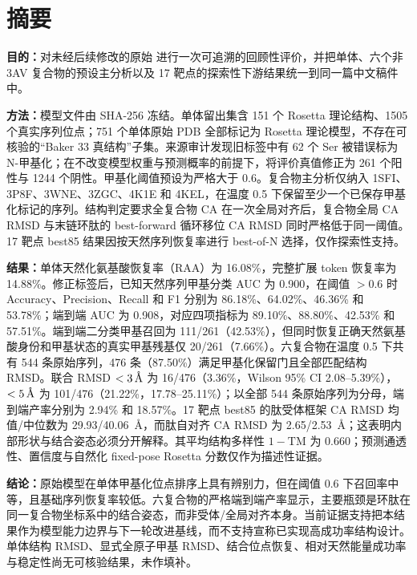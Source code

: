 \section*{摘要}

\textbf{目的：}对未经后续修改的原始  进行一次可追溯的回顾性评价，并把单体、六个非 3AV 复合物的预设主分析以及 17 靶点的探索性下游结果统一到同一篇中文稿件中。

\textbf{方法：}模型文件由 SHA-256 冻结。单体留出集含 151 个 Rosetta 理论结构、1505 个真实序列位点；751 个单体原始 PDB 全部标记为 Rosetta 理论模型，不存在可核验的“Baker 33 真结构”子集。来源审计发现旧标签中有 62 个 Ser 被错误标为 N-甲基化；在不改变模型权重与预测概率的前提下，将评价真值修正为 261 个阳性与 1244 个阴性。甲基化阈值预设为严格大于 0.6。复合物主分析仅纳入 1SFI、3P8F、3WNE、3ZGC、4K1E 和 4KEL，在温度 0.5 下保留至少一个已保存甲基化标记的序列。结构判定要求全复合物 CA 在一次全局对齐后，复合物全局 CA RMSD 与末链环肽的 best-forward 循环移位 CA RMSD 同时严格低于同一阈值。17 靶点 best85 结果因按天然序列恢复率进行 best-of-N 选择，仅作探索性支持。

\textbf{结果：}单体天然化氨基酸恢复率（RAA）为 16.08\%，完整扩展 token 恢复率为 14.88\%。修正标签后，已知天然序列甲基分类 AUC 为 0.900，在阈值 $>0.6$ 时 Accuracy、Precision、Recall 和 F1 分别为 86.18\%、64.02\%、46.36\% 和 53.78\%；端到端 AUC 为 0.908，对应四项指标为 89.10\%、88.80\%、42.53\% 和 57.51\%。端到端二分类甲基召回为 111/261（42.53\%），但同时恢复正确天然氨基酸身份和甲基状态的真实甲基残基仅 20/261（7.66\%）。六复合物在温度 0.5 下共有 544 条原始序列，476 条（87.50\%）满足甲基化保留门且全部匹配结构 RMSD。联合 RMSD $<3\,\text{\AA}$ 为 16/476（3.36\%，Wilson 95\% CI 2.08--5.39\%），$<5\,\text{\AA}$ 为 101/476（21.22\%，17.78--25.11\%）；以全部 544 条原始序列为分母，端到端产率分别为 2.94\% 和 18.57\%。17 靶点 best85 的肽受体框架 CA RMSD 均值/中位数为 29.93/40.06~\AA，而肽自对齐 CA RMSD 为 2.65/2.53~\AA；这表明内部形状与结合姿态必须分开解释。其平均结构多样性 $1-\mathrm{TM}$ 为 0.660；预测通透性、置信度与自然化 fixed-pose Rosetta 分数仅作为描述性证据。

\textbf{结论：}原始模型在单体甲基化位点排序上具有辨别力，但在阈值 0.6 下召回率中等，且基础序列恢复率较低。六复合物的严格端到端产率显示，主要瓶颈是环肽在同一复合物坐标系中的结合姿态，而非受体/全局对齐本身。当前证据支持把本结果作为模型能力边界与下一轮改进基线，而不支持宣称已实现高成功率结构设计。单体结构 RMSD、显式全原子甲基 RMSD、结合位点恢复、相对天然能量成功率与稳定性尚无可核验结果，未作填补。

